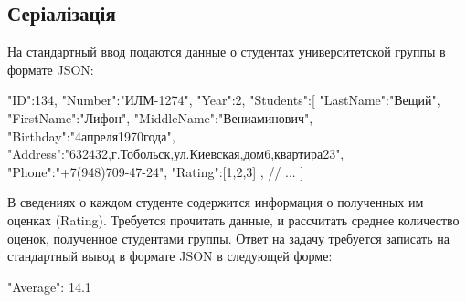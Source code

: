 \documentclass[]{article}
\begin{document}
\subsection{Серіалізація}

На стандартный ввод подаются данные о студентах университетской группы в формате JSON:

{
    "ID":134,
    "Number":"ИЛМ-1274",
    "Year":2,
    "Students":[
        {
            "LastName":"Вещий",
            "FirstName":"Лифон",
            "MiddleName":"Вениаминович",
            "Birthday":"4апреля1970года",
            "Address":"632432,г.Тобольск,ул.Киевская,дом6,квартира23",
            "Phone":"+7(948)709-47-24",
            "Rating":[1,2,3]
        },
        {
            // ...
        }
    ]
}

В сведениях о каждом студенте содержится информация о полученных им оценках (Rating). Требуется прочитать данные, и рассчитать среднее количество оценок, полученное студентами группы. Ответ на задачу требуется записать на стандартный вывод в формате JSON в следующей форме:

{
    "Average": 14.1
}
\end{document}
